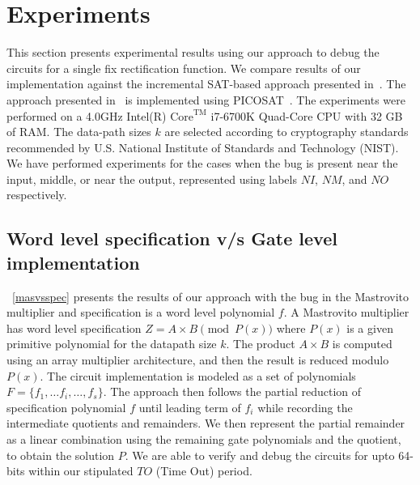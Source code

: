\section{Experiments}
\label{sec:exp}

This section presents experimental results using our approach to debug the circuits for a single fix rectification function.
We compare results of our implementation against the incremental SAT-based approach presented in~\cite{fujita:2015}.
The approach presented in~\cite{fujita:2015} is implemented using PICOSAT~\cite{picosat}. The experiments were performed on a 4.0GHz 
Intel(R) $\text{Core}^{\text{TM}}$ i7-6700K Quad-Core CPU with 32 GB of RAM. The data-path sizes {$k$} are selected according to cryptography standards recommended by U.S. National Institute of Standards and Technology (NIST). 
We have performed experiments for the cases when the bug is present near 
the input, middle, or near the output, represented using labels $NI$, $NM$, and $NO$ respectively.

\subsection{Word level specification v/s Gate level implementation}
~\autoref{masvsspec} presents the results of our approach with the bug 
in the Mastrovito multiplier and specification is a word level polynomial $f$. 
A Mastrovito multiplier has word level specification $Z = A\times B \pmod{ P(x)}$ 
where $P(x)$ is a given primitive polynomial for the datapath size $k$. The product $A \times B$ 
is computed using an array multiplier architecture, and then the result is reduced modulo $P(x)$. 
The circuit implementation is modeled as a set of polynomials $F=\{f_1,\dots f_i,\dots,f_s\}$. The 
approach then follows the partial reduction of specification polynomial $f$ until leading term of $f_i$ while
recording the intermediate quotients and remainders. We then represent the partial remainder as a linear combination
using the remaining gate polynomials and the quotient, to obtain the solution $P$. We 
are able to verify and debug the circuits for upto 64-bits within our stipulated $TO$ (Time Out) period.

